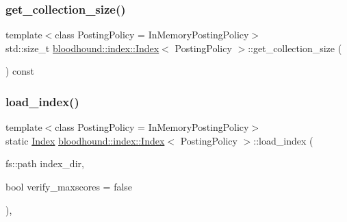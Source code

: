 \mbox{\label{classbloodhound_1_1index_1_1Index_aead1eb965d1607d25398b874cbd8a269}} 
\subsubsection{\texorpdfstring{get\+\_\+collection\+\_\+size()}{get\_collection\_size()}}
{\footnotesize\ttfamily template$<$class Posting\+Policy = In\+Memory\+Posting\+Policy$>$ \\
std\+::size\+\_\+t \mbox{\hyperlink{classbloodhound_1_1index_1_1Index}{bloodhound\+::index\+::\+Index}}$<$ Posting\+Policy $>$\+::get\+\_\+collection\+\_\+size (\begin{DoxyParamCaption}{ }\end{DoxyParamCaption}) const\hspace{0.3cm}{\ttfamily [inline]}}

\mbox{\label{classbloodhound_1_1index_1_1Index_ad4cd13bef623fc6b786f8003c8826b9c}} 
\subsubsection{\texorpdfstring{load\+\_\+index()}{load\_index()}}
{\footnotesize\ttfamily template$<$class Posting\+Policy = In\+Memory\+Posting\+Policy$>$ \\
static \mbox{\hyperlink{classbloodhound_1_1index_1_1Index}{Index}} \mbox{\hyperlink{classbloodhound_1_1index_1_1Index}{bloodhound\+::index\+::\+Index}}$<$ Posting\+Policy $>$\+::load\+\_\+index (\begin{DoxyParamCaption}\item[{fs\+::path}]{index\+\_\+dir,  }\item[{bool}]{verify\+\_\+maxscores = {\ttfamily false} }\end{DoxyParamCaption})\hspace{0.3cm}{\ttfamily [inline]}, {\ttfamily [static]}}

